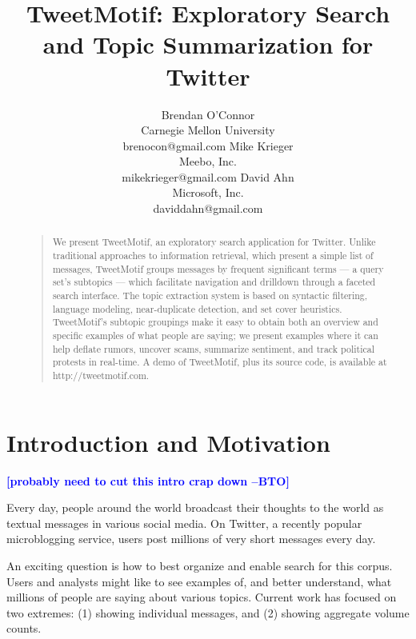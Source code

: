 \documentclass[letterpaper]{article}
\newcommand{\bto}[1]{\textcolor{blue}{\textbf{[#1 --BTO]}}}
\begin{document}
%
\title{TweetMotif: Exploratory Search and Topic Summarization for Twitter}
\author{Brendan O'Connor \\ 
Carnegie Mellon University \\ brenocon@gmail.com
\And
Mike Krieger \\ Meebo, Inc. \\ mikekrieger@gmail.com
\And
David Ahn \\ Microsoft, Inc. \\ daviddahn@gmail.com
}
\maketitle
\begin{abstract}
\begin{quote}
We present TweetMotif, an exploratory search application for Twitter.  Unlike traditional approaches to information retrieval, which present a simple list of messages, TweetMotif groups messages by frequent significant terms --- a query set's subtopics --- which facilitate navigation and drilldown through a faceted search interface.  The topic extraction system is based on syntactic filtering, language modeling, near-duplicate detection, and set cover heuristics.  TweetMotif's subtopic groupings make it easy to obtain both an overview and specific examples of what people are saying; we present examples where it can help deflate rumors, uncover scams, summarize sentiment, and track political protests in real-time.   A demo of TweetMotif, plus its source code, is available at http://tweetmotif.com.
\end{quote}
\end{abstract}

\section{Introduction and Motivation}

\bto{probably need to cut this intro crap down}

Every day, people around the world broadcast their thoughts to the world as textual messages in various social media.  On Twitter, a recently popular microblogging service, users post millions of very short messages every day.

An exciting question is how to best organize and enable search for this corpus.  Users and analysts might like to see examples of, and better understand, what millions of people are saying about various topics.  Current work has focused on two extremes: (1) showing individual messages, and (2) showing aggregate volume counts.
\end{document}

